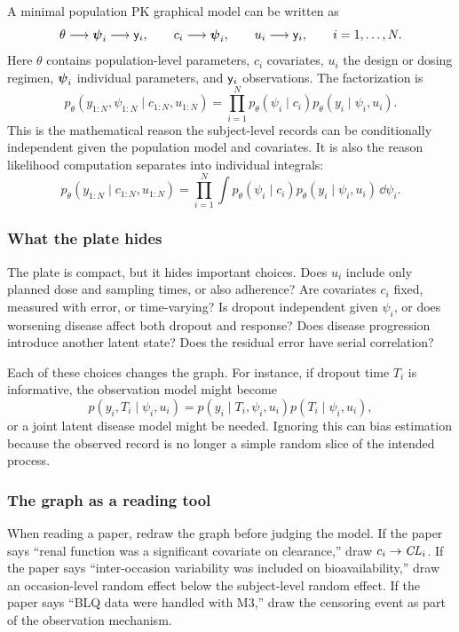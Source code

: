A minimal population PK graphical model can be written as
\[
  \theta \longrightarrow \boldsymbol{\psi}_i \longrightarrow \mathsf{y}_i,
  \qquad
  c_i \longrightarrow \boldsymbol{\psi}_i,
  \qquad
  u_i \longrightarrow \mathsf{y}_i,
  \qquad
  i=1,\ldots,N.
\]
Here \(\theta\) contains population-level parameters, \(c_i\) covariates, \(u_i\) the design or dosing regimen, \(\boldsymbol{\psi}_i\) individual parameters, and \(\mathsf{y}_i\) observations.  The factorization is
\[
  p_\theta(y_{1:N},\psi_{1:N}\mid c_{1:N},u_{1:N})
  =
  \prod_{i=1}^N
  p_\theta(\psi_i\mid c_i)
  p_\theta(y_i\mid \psi_i,u_i).
\]
This is the mathematical reason the subject-level records can be conditionally independent given the population model and covariates.  It is also the reason likelihood computation separates into individual integrals:
\[
  p_\theta(y_{1:N}\mid c_{1:N},u_{1:N})
  =
  \prod_{i=1}^N
  \int
  p_\theta(\psi_i\mid c_i)
  p_\theta(y_i\mid \psi_i,u_i)
  \,\dd\psi_i.
\]

\subsubsection*{What the plate hides}

The plate is compact, but it hides important choices.  Does \(u_i\) include only planned dose and sampling times, or also adherence?  Are covariates \(c_i\) fixed, measured with error, or time-varying?  Is dropout independent given \(\psi_i\), or does worsening disease affect both dropout and response?  Does disease progression introduce another latent state?  Does the residual error have serial correlation?

Each of these choices changes the graph.  For instance, if dropout time \(T_i\) is informative, the observation model might become
\[
  p(y_i,T_i\mid \psi_i,u_i)
  =
  p(y_i\mid T_i,\psi_i,u_i)p(T_i\mid \psi_i,u_i),
\]
or a joint latent disease model might be needed.  Ignoring this can bias estimation because the observed record is no longer a simple random slice of the intended process.

\subsubsection*{The graph as a reading tool}

When reading a paper, redraw the graph before judging the model.  If the paper says ``renal function was a significant covariate on clearance,'' draw \(c_i\to \pksym{CL}_i\).  If the paper says ``inter-occasion variability was included on bioavailability,'' draw an occasion-level random effect below the subject-level random effect.  If the paper says ``BLQ data were handled with M3,'' draw the censoring event as part of the observation mechanism.


